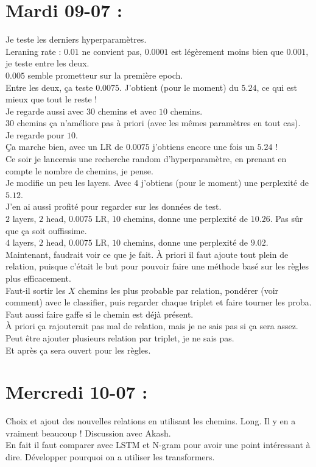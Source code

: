 \documentclass{article}
\begin{document}
\section*{Mardi 09-07 :}
Je teste les derniers hyperparamètres.\\
Leraning rate : $0.01$ ne convient pas, $0.0001$ est légèrement moins bien que $0.001$, je   teste entre les deux.\\
$0.005$ semble prometteur sur la première epoch.\\  
Entre les deux, ça teste $0.0075$. J'obtient (pour le moment) du $5.24$, ce qui est mieux que tout le reste !\\
Je regarde aussi avec $30$ chemins et avec $10$ chemins.\\
$30$ chemins ça n'améliore pas à priori (avec les mêmes paramètres en tout cas).\\
Je regarde pour $10$.\\
Ça marche bien, avec un LR de $0.0075$ j'obtiens encore une fois un $5.24$ !\\
Ce soir je lancerais une recherche random d'hyperparamètre, en prenant en compte le nombre de chemins, je pense.\\
Je modifie un peu les layers. Avec $4$ j'obtiens (pour le moment) une perplexité de $5.12$.\\
J'en ai aussi profité pour regarder sur les données de test.\\
$2$ layers, $2$ head, $0.0075$ LR, $10$ chemins, donne une perplexité de $10.26$. Pas sûr que ça soit ouffissime.\\
$4$ layers, $2$ head, $0.0075$ LR, $10$ chemins, donne une perplexité de $9.02$.\\
Maintenant, faudrait voir ce que je fait. À priori il faut ajoute tout plein de relation, puisque c'était le but pour pouvoir faire une méthode basé sur les règles plus efficacement.\\
Faut-il sortir les $X$ chemins les plus probable par relation, pondérer (voir comment) avec le classifier, puis regarder chaque triplet et faire tourner les proba.\\
Faut aussi faire gaffe si le chemin est déjà présent.\\
À priori ça rajouterait pas mal de relation, mais je ne sais pas si ça sera assez. Peut être ajouter plusieurs relation par triplet, je ne sais pas.\\
Et après ça sera ouvert pour les règles.
\section*{Mercredi 10-07 :}
Choix et ajout des nouvelles relations en utilisant les chemins. Long. Il y en a vraiment beaucoup !
Discussion avec Akash.\\
En fait il faut comparer avec LSTM et N-gram pour avoir une point intéressant à dire. Développer pourquoi on a utiliser les transformers.\\
\end{document}
